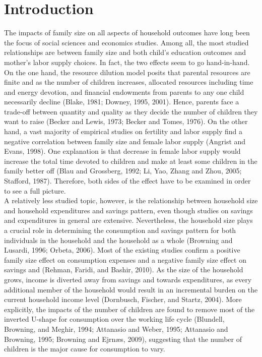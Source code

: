 \documentclass[12pt]{extarticle}
\begin{document}
\section{Introduction}
The impacts of family size on all aspects of household outcomes have long been the focus of social sciences and economics studies. Among all, the most studied relationships are between family size and both child's education outcomes and mother's labor supply choices. In fact, the two effects seem to go hand-in-hand. On the one hand, the resource dilution model posits that parental resources are finite and as the number of children increases, allocated resources including time and energy devotion, and financial endowments from parents to any one child necessarily decline (Blake, 1981; Downey, 1995, 2001). Hence, parents face a trade-off between quantity and quality as they decide the number of children they want to raise (Becker and Lewis, 1973; Becker and Tomes, 1976). On the other hand, a vast majority of empirical studies on fertility and labor supply find a negative correlation between family size and female labor supply (Angrist and Evans, 1998). One explanation is that decrease in female labor supply would increase the total time devoted to children and make at least some children in the family better off (Blau and Grossberg, 1992; Li, Yao, Zhang and Zhou, 2005; Stafford, 1987). Therefore, both sides of the effect have to be examined in order to see a full picture. \\
\indent A relatively less studied topic, however, is the relationship between household size and household expenditures and savings pattern, even though studies on savings and expenditures in general are extensive. Nevertheless, the household size plays a crucial role in determining the consumption and savings pattern for both individuals in the household and the household as a whole (Browning and Lusardi, 1996; Orbeta, 2006). Most of the existing studies confirm a positive family size effect on consumption expenses and a negative family size effect on savings and (Rehman, Faridi, and Bashir, 2010). As the size of the household grows, income is diverted away from savings and towards expenditures, as every additional member of the household would result in an incremental burden on the current household income level (Dornbusch, Fischer, and Startz, 2004). More explicitly, the impacts of the number of children are found to remove most of the inverted U-shape for consumption over the working life cycle (Blundell, Browning, and Meghir, 1994; Attanasio and Weber, 1995; Attanasio and Browning, 1995; Browning and Ejrnæs, 2009), suggesting that the number of children is the major cause for consumption to vary. \\
\end{document}

